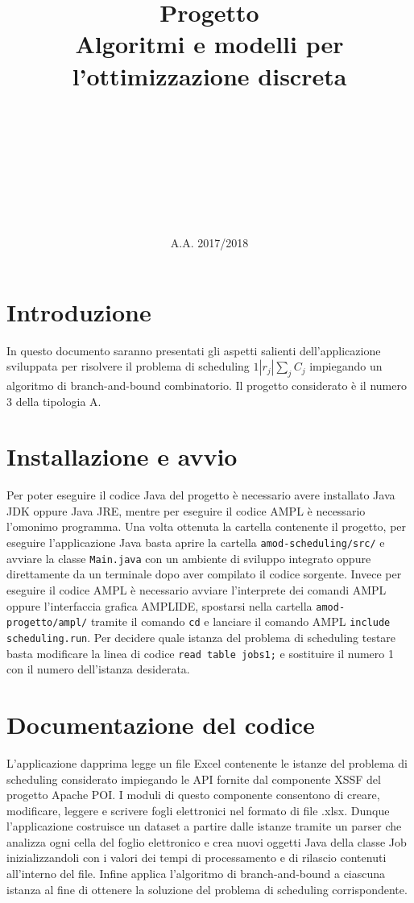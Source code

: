 \documentclass[a4paper]{article}
\title{Progetto\\
	Algoritmi e modelli per l'ottimizzazione discreta\\
}
\author{
	\text{Scarpitta}\\
	\text{email}\\
	\text{matricola}
	\and
	\text{Schmidt}\\
	\text{email}\\
	\text{matricola}
	\and
	\text{Tranzocchi}\\
	\text{email}\\
	\text{matricola}
}
\date{A.A. 2017/2018}
\begin{document}
\maketitle

\newpage


\section{Introduzione}
In questo documento saranno presentati gli aspetti salienti dell'applicazione sviluppata per risolvere il problema di scheduling $1 | r_j | \sum_{j} C_j$ impiegando un algoritmo di branch-and-bound combinatorio. Il progetto considerato è il numero 3 della tipologia A.

\section{Installazione e avvio}
Per poter eseguire il codice Java del progetto è necessario avere installato Java JDK oppure Java JRE, mentre per eseguire il codice AMPL è necessario l'omonimo programma. 
Una volta ottenuta la cartella contenente il progetto, per eseguire l'applicazione Java basta aprire la cartella \texttt{amod-scheduling/src/} e avviare la classe \texttt{Main.java} con un ambiente di sviluppo integrato oppure direttamente da un terminale dopo aver compilato il codice sorgente. Invece per eseguire il codice AMPL è necessario avviare l'interprete dei comandi AMPL oppure l'interfaccia grafica AMPLIDE, spostarsi nella cartella \texttt{amod-progetto/ampl/} tramite il comando \texttt{cd} e lanciare il comando AMPL \texttt{include scheduling.run}. Per decidere quale istanza del problema di scheduling testare basta modificare la linea di codice \texttt{read table jobs1;} e sostituire il numero 1 con il numero dell'istanza desiderata.

\section{Documentazione del codice}
L'applicazione dapprima legge un file Excel contenente le istanze del problema di scheduling considerato impiegando le API fornite dal componente XSSF del progetto Apache POI. I moduli di questo componente consentono di creare, modificare, leggere e scrivere fogli elettronici nel formato di file .xlsx. Dunque l'applicazione costruisce un dataset a partire dalle istanze tramite un parser che analizza ogni cella del foglio elettronico e crea nuovi oggetti Java della classe Job inizializzandoli con i valori dei tempi di processamento e di rilascio contenuti all'interno del file. Infine applica l'algoritmo di branch-and-bound a ciascuna istanza al fine di ottenere la soluzione del problema di scheduling corrispondente.
\end{document}
